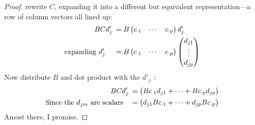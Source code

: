 \documentclass[12pt]{article}
\theoremstyle{plain}
\theoremstyle{definition}
\theoremstyle{remark}
\begin{document}
\begin{proof}
rewrite $C$, expanding it into a different but equivalent
representation---a row of column vectors all lined up:
\begin{align*}
    BCd'_{j\cdot} &= B
	\begin{pmatrix} c_{\cdot 1} & \cdots & c_{\cdot p}
	\end{pmatrix} d'_{j \cdot} \notag \\
    \text{expanding $d'_{j \cdot}$} \quad
	&= B
	\begin{pmatrix} c_{\cdot 1} & \cdots & c_{\cdot p}
	\end{pmatrix}
	\begin{pmatrix} d_{j 1} \\ \vdots \\ d_{j p}
	\end{pmatrix}
\end{align*}
Now distribute $B$ and dot product with the $d'_{j\cdot}$:
\begin{align}
    BCd'_{j\cdot} &=
	\begin{pmatrix} Bc_{\cdot 1} d_{j 1} + \cdots
	    + Bc_{\cdot p} d_{j p}
	\end{pmatrix}   \notag \\
    \text{Since the $d_{jm}$ are scalars} \quad &=
	\begin{pmatrix}  d_{j 1} Bc_{\cdot 1} + \cdots
	    +  d_{j p}Bc_{\cdot p}
	\end{pmatrix}   \notag
\end{align}
Amost there, I promise.


\end{proof}
\end{document}
